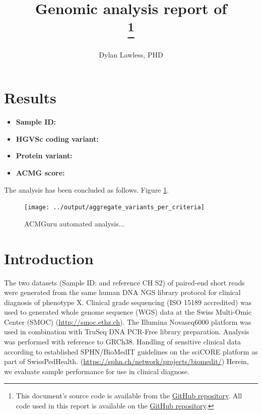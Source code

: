 \documentclass{article}
\begin{document}
\title{\Large \bf Genomic analysis report of\\
{\color{kispired}\SampleID}
\footnote{This document's source code is available from the 
\href{https://github.com/DylanLawless/kit_assess/blob/master/latex/report.tex}{GitHub repository}.
All code used in this report is available on the 
\href{https://github.com/DylanLawless/kit_assess}{GitHub repository}.}
}
\author[1]{\rm Dylan Lawless, PHD}

\maketitle
\color{kispiblue}
\section{Results}

\begin{itemize}
\item \textbf{Sample ID:} {\color{kispired}\SampleID}
\item \textbf{HGVSc coding variant:} {\color{kispired}\CodingVariant}
\item \textbf{Protein variant:} {\color{kispired}\ProteinVariant}
\item \textbf{ACMG score:} {\color{kispired}\ACMGScore}
\end{itemize}
The analysis has been concluded as follows.
{\color{kispired} Figure} \ref{fig:acmguru_p1}.

\begin{figure}[h] \hspace*{0cm} 
\begin{center}
    \texttt{[image: ../output/aggregate\_variants\_per\_criteria]}
	\caption{ACMGuru automated analysis...}
	\label{fig:acmguru_p1}
\end{center}
\end{figure}



\section{Introduction}
\label{intro}
The two datasets (Sample ID: {\color{kispired}\SampleID} and reference CH S2) of paired-end short reads were generated from the same human DNA NGS library protocol for clinical diagnosis of phenotype X. 
Clinical grade sequencing (ISO 15189 accredited) was used 
to generated whole genome sequence (WGS) data
at the Swiss Multi-Omic Center (SMOC) 
(\url{http://smoc.ethz.ch}).
The Illumina Novaseq6000 platform was used in combination with 
TruSeq DNA PCR-Free library preparation.
Analysis was performed with reference to GRCh38. 
Handling of sensitive clinical data according to established SPHN/BioMedIT guidelines on the sciCORE platform as part of  SwissPedHealth.
(\url{https://sphn.ch/network/projects/biomedit/})
Herein, we evaluate sample performance for use in clinical diagnose.
\end{document}
